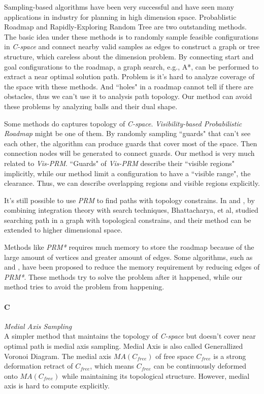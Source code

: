 \documentclass[11pt]{article}
\begin{document}
\indent Sampling-based algorithms have been very successful and have seen many applications in industry for planning in high dimension space. Probablistic Roadmap \cite{PRM} and Rapidly-Exploring Random Tree \cite{RRT} are two outstanding methods. The basic idea under these methods is to randomly sample feasible configurations in \emph{C-space} and connect nearby valid samples as edges to construct a graph or tree structure, which careless about the dimension problem. By connecting start and goal configurations to the roadmap, a graph search, e.g., A*, can be performed to extract a near optimal solution path. Problem is it's hard to analyze coverage of the space with these methods. And ``holes" in a roadmap cannot tell if there are obstacles, thus we can't use it to analysis path topology. Our method can avoid these problems by analyzing balls and their dual shape.

\indent Some methods do captures topology of \emph{C-space}. \emph{Visibility-based Probabilistic Roadmap}\cite{vprm} might be one of them. By randomly sampling ``guards" that can't see each other, the algorithm can produce guards that cover most of the space. Then connection nodes will be generated to connect guards. Our method is very much related to \emph{Vis-PRM}. ``Guards" of \emph{Vis-PRM} describe their ``visible regions" implicitly, while our method limit a configuration to have a ``visible range", the clearance. Thus, we can describe overlapping regions and visible regions explicitly.
 
\indent It's still possible to use \emph{PRM} to find paths with topology constrains. In \cite{pathtopsearch} and \cite{pathtop}, by combining integration theory with search techniques, Bhattacharya, et al, studied searching path in a graph with topological constrains, and their method can be extended to higher dimensional space. 

\indent Methods like \emph{PRM*} requires much memory to store the roadmap because of the large amount of vertices and greater amount of edges. Some algorithms, such as \cite{weifu} and \cite{bekris}, have been proposed to reduce the memory requirement by reducing edges of \emph{PRM*}. These methods try to solve the problem after it happened, while our method tries to avoid the problem from happening.

\paragraph{C} \emph{Medial Axis Sampling} \hfill \\
\indent A simpler method that maintains the topology of \emph{C-space} but doesn't cover near optimal path is medial axis sampling. Medial Axis is also called Generallized Voronoi Diagram. The medial axis $MA(C_{free})$ of free space $C_{free}$ is a strong deformation retract of $C_{free}$, which means $C_{free}$ can be continuously deformed onto $MA(C_{free})$ while maintaining its topological structure. However, medial axis is hard to compute explicitly.
\end{document}
